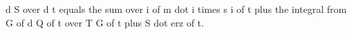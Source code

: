 d S over d t equals the sum over i of m dot i times s i of t plus the integral from G of d Q of t over T G of t plus S dot erz of t.